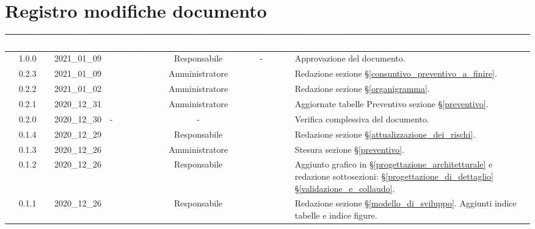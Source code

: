 \section*{Registro modifiche documento}
{

     
\renewcommand{\arraystretch}{1.5}
\centering
\begin{longtable}{c c C{3cm} c c C{3cm}}


 \textcolor{white}{\textbf{Versione}}&
    \textcolor{white}{\textbf{Data}}&
    \textcolor{white}{\textbf{Nominativo}}&
    \textcolor{white}{\textbf{Ruolo}}&
    \textcolor{white}{\textbf{Verificatore}}&
    \textcolor{white}{\textbf{Descrizione}}\\	
    \endhead
    
     1.0.0 & 2021\_01\_09 & \TL{} & Responsabile & - &  Approvazione del documento. \\
    
    0.2.3 & 2021\_01\_09 & \PC{} & Amministratore & \TG{} &  Redazione sezione \S\ref{consuntivo_preventivo_a_finire}. \\
    
	0.2.2 & 2021\_01\_02 & \PC{} & Amministratore & \TG{} & Redazione sezione \S\ref{organigramma}. \\
    
  	0.2.1 & 2020\_12\_31 & \TG{} & Amministratore & \PC{} & Aggiornate tabelle Preventivo sezione \S\ref{preventivo}.\\
 
	0.2.0 & 2020\_12\_30 &  -  & - &  \TG{} & Verifica complessiva del documento.\\

    0.1.4 & 2020\_12\_29 & \MM{} & Responsabile & \TG{} & Redazione sezione \S\ref{attualizzazione_dei_rischi}. \\


    0.1.3 & 2020\_12\_26 & \PC{} & Amministratore & \TG{} & Stesura sezione \S\ref{preventivo}. \\

    0.1.2 & 2020\_12\_26 & \MM{} & Responsabile & \TG{} & Aggiunto grafico in \S\ref{progettazione_architetturale} e redazione sottosezioni:  \S\ref{progettazione_di_dettaglio} \S\ref{validazione_e_collaudo}. \\

    0.1.1 & 2020\_12\_26 & \MM{} & Responsabile & \TG{} & Redazione sezione \S\ref{modello_di_sviluppo}. Aggiunti indice tabelle e indice figure. \\


\end{longtable}}
